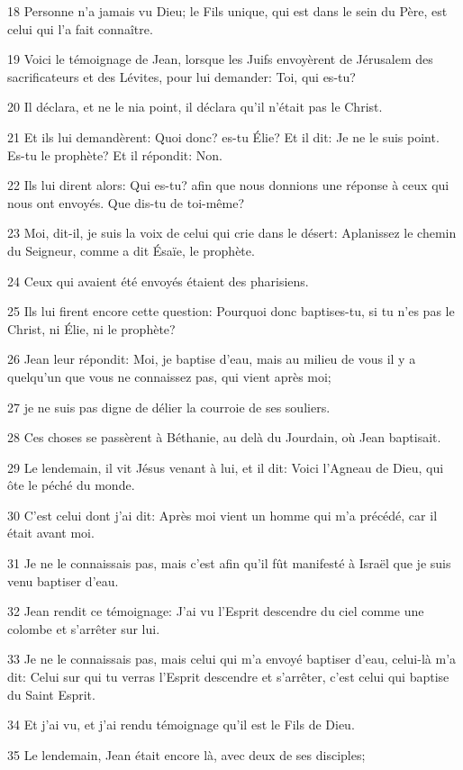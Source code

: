 \par 18 Personne n'a jamais vu Dieu; le Fils unique, qui est dans le sein du Père, est celui qui l'a fait connaître.
\par 19 Voici le témoignage de Jean, lorsque les Juifs envoyèrent de Jérusalem des sacrificateurs et des Lévites, pour lui demander: Toi, qui es-tu?
\par 20 Il déclara, et ne le nia point, il déclara qu'il n'était pas le Christ.
\par 21 Et ils lui demandèrent: Quoi donc? es-tu Élie? Et il dit: Je ne le suis point. Es-tu le prophète? Et il répondit: Non.
\par 22 Ils lui dirent alors: Qui es-tu? afin que nous donnions une réponse à ceux qui nous ont envoyés. Que dis-tu de toi-même?
\par 23 Moi, dit-il, je suis la voix de celui qui crie dans le désert: Aplanissez le chemin du Seigneur, comme a dit Ésaïe, le prophète.
\par 24 Ceux qui avaient été envoyés étaient des pharisiens.
\par 25 Ils lui firent encore cette question: Pourquoi donc baptises-tu, si tu n'es pas le Christ, ni Élie, ni le prophète?
\par 26 Jean leur répondit: Moi, je baptise d'eau, mais au milieu de vous il y a quelqu'un que vous ne connaissez pas, qui vient après moi;
\par 27 je ne suis pas digne de délier la courroie de ses souliers.
\par 28 Ces choses se passèrent à Béthanie, au delà du Jourdain, où Jean baptisait.
\par 29 Le lendemain, il vit Jésus venant à lui, et il dit: Voici l'Agneau de Dieu, qui ôte le péché du monde.
\par 30 C'est celui dont j'ai dit: Après moi vient un homme qui m'a précédé, car il était avant moi.
\par 31 Je ne le connaissais pas, mais c'est afin qu'il fût manifesté à Israël que je suis venu baptiser d'eau.
\par 32 Jean rendit ce témoignage: J'ai vu l'Esprit descendre du ciel comme une colombe et s'arrêter sur lui.
\par 33 Je ne le connaissais pas, mais celui qui m'a envoyé baptiser d'eau, celui-là m'a dit: Celui sur qui tu verras l'Esprit descendre et s'arrêter, c'est celui qui baptise du Saint Esprit.
\par 34 Et j'ai vu, et j'ai rendu témoignage qu'il est le Fils de Dieu.
\par 35 Le lendemain, Jean était encore là, avec deux de ses disciples;
